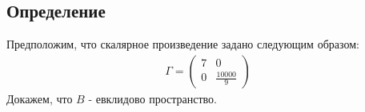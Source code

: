 \subsection*{Определение}
Предположим, что скалярное произведение задано следующим образом:
\newcommand{\mtxa}{{7}}
\newcommand{\mtxb}{{\frac{10000}{9}}}
\newcommand{\mtx}{{\begin{pmatrix} \mtxa & 0 \\ 0 & \mtxb \end{pmatrix}}}
\begin{align*}
  \Gamma = \mtx
\end{align*}
Докажем, что $B$ - евклидово пространство.